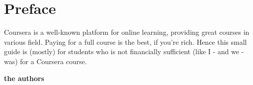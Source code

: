 \chapter*{Preface}

Coursera is a well-known platform for online learning, providing great courses in various field. Paying for a full course is the best, if you're rich. Hence this small guide is (mostly) for students who is not financially sufficient (like I - and we - was) for a Coursera course. 

{
\hspace*{\fill}\textbf{the authors}
}